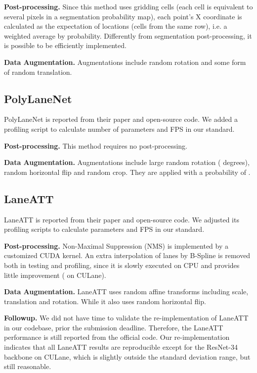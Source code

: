 \documentclass[10pt,twocolumn,letterpaper]{article}
\begin{document}
\noindent \textbf{Post-processing.} Since this method uses gridding cells (each cell is equivalent to several pixels in a segmentation probability map), each point's X coordinate is calculated as the expectation of locations (cells from the same row), i.e. a weighted average by probability. Differently from segmentation post-processing, it is possible to be efficiently implemented.

\noindent \textbf{Data Augmentation.} Augmentations include random rotation and some form of random translation.

\subsection{PolyLaneNet}
\label{subsec:polylanenet}

PolyLaneNet \cite{tabelini2021polylanenet} is reported from their paper and open-source code. We added a profiling script to calculate number of parameters and FPS in our standard.

\noindent \textbf{Post-processing.} This method requires no post-processing.

\noindent \textbf{Data Augmentation.} Augmentations include large random rotation ( degrees), random horizontal flip and random crop. They are applied with a probability of .

\subsection{LaneATT}
\label{subsec:laneatt}

LaneATT \cite{tabelini2021keep} is reported from their paper and open-source code. We adjusted its profiling scripts to calculate parameters and FPS in our standard.

\noindent \textbf{Post-processing.} Non-Maximal Suppression (NMS) is implemented by a customized CUDA kernel. An extra interpolation of lanes by B-Spline is removed both in testing and profiling, since it is slowly executed on CPU and provides little improvement ( on CULane).

\noindent \textbf{Data Augmentation.} LaneATT uses random affine transforms including scale, translation and rotation. While it also uses random horizontal flip.

\noindent \textbf{Followup.} We did not have time to validate the re-implementation of LaneATT in our codebase, prior the submission deadline. Therefore, the LaneATT performance is still reported from the official code. Our re-implementation indicates that all LaneATT results are reproducible except for the ResNet-34 backbone on CULane, which is slightly outside the standard deviation range, but still reasonable.
\end{document}
